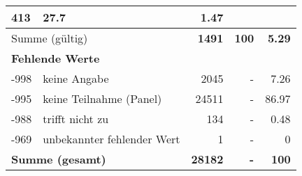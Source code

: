 \begin{longtable}{lXrrr}
       \num{413} &
       \num[round-mode=places,round-precision=2]{27.7} &
         \num[round-mode=places,round-precision=2]{1.47} \\
     \midrule
     \multicolumn{2}{l}{Summe (gültig)} &
       \textbf{\num{1491}} &
     \textbf{\num{100}} &
       \textbf{\num[round-mode=places,round-precision=2]{5.29}} \\
     \multicolumn{5}{l}{\textbf{Fehlende Werte}}\\
       -998 &
       keine Angabe &
         \num{2045} &
        - &
         \num[round-mode=places,round-precision=2]{7.26} \\
       -995 &
       keine Teilnahme (Panel) &
         \num{24511} &
        - &
         \num[round-mode=places,round-precision=2]{86.97} \\
       -988 &
       trifft nicht zu &
         \num{134} &
        - &
         \num[round-mode=places,round-precision=2]{0.48} \\
       -969 &
       unbekannter fehlender Wert &
         \num{1} &
        - &
         \num[round-mode=places,round-precision=2]{0} \\
     \midrule
     \multicolumn{2}{l}{\textbf{Summe (gesamt)}} &
          \textbf{\num{28182}} &
        \textbf{-} &
        \textbf{\num{100}} \\
     \bottomrule
     \end{longtable}
     
